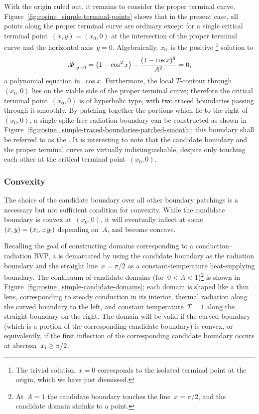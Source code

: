 With the origin ruled out,
it remains to consider the proper terminal curve.
Figure~\ref{fig:cosine_simple-terminal-points} shows that in the present case,
all points along the proper terminal curve are ordinary
except for a single critical terminal point~$(x, y) = (x_0, 0)$
at the intersection of the proper terminal curve
and the horizontal axis~$y = 0$.
Algebraically, $x_0$~is the positive%
\footnote{
  The trivial solution~$x = 0$
  corresponds to the isolated terminal point at the origin,
  which we have just dismissed.
}
solution to
\begin{equation}
  \eval[\textsize]{\Phi}_{y=0}
  = \roundbr*{1 - \cos^2 x} - \frac{(1 - \cos x)^8}{A^2}
  = 0,
  \label{eq:cosine-simple-critical-terminal-point-x}
\end{equation}
a polynomial equation in~$\cos x$.
Furthermore, the local $T$-contour through~$(x_0, 0)$
lies on the viable side of the proper terminal curve;
therefore the critical terminal point~$(x_0, 0)$ is of hyperbolic type,
with two traced boundaries passing through it smoothly.
By patching together the portions which lie to the right of~$(x_0, 0)$,
a single spike-free radiation boundary can be constructed
as shown in Figure~\ref{fig:cosine_simple-traced-boundaries-patched-smooth};
this boundary shall be referred to as the .
It is interesting to note that
the candidate boundary and the proper terminal curve
are virtually indistinguishable,
despite only touching each other at the critical terminal point~$(x_0, 0)$.

\subsubsection{Convexity}
\label{sec:cartesian.cosine.simple.convexity}

The choice of the candidate boundary over all other boundary patchings
is a necessary but not sufficient condition for convexity.
While the candidate boundary is convex at~$(x_0, 0)$,
it will eventually inflect
at some~$(x, y) = (x_{\mathrm{i}}, \pm y_{\mathrm{i}})$ depending on~$A$,
and become concave.

Recalling the goal of constructing domains
corresponding to a conduction--radiation BVP\@,
a  is demarcated by using
the candidate boundary as the radiation boundary
and the straight line~$x = \pi/2$
as a constant-temperature heat-supplying boundary.
The continuum of candidate domains (for~$0 < A < 1$)\footnote{
  At~$A = 1$ the candidate boundary touches the line~$x = \pi/2$,
  and the candidate domain shrinks to a point.
}
is shown in Figure~\ref{fig:cosine_simple-candidate-domains};
each domain is shaped like a thin lens,
corresponding to steady conduction in its interior,
thermal radiation along the curved boundary to the left,
and constant temperature~$T = 1$ along the straight boundary on the right.
The domain will be valid if the curved boundary
(which is a portion of the corresponding candidate boundary)
is convex, or equivalently,
if the first inflection of the corresponding candidate boundary
occurs at abscissa~$x_{\mathrm{i}} \ge \pi/2$.

